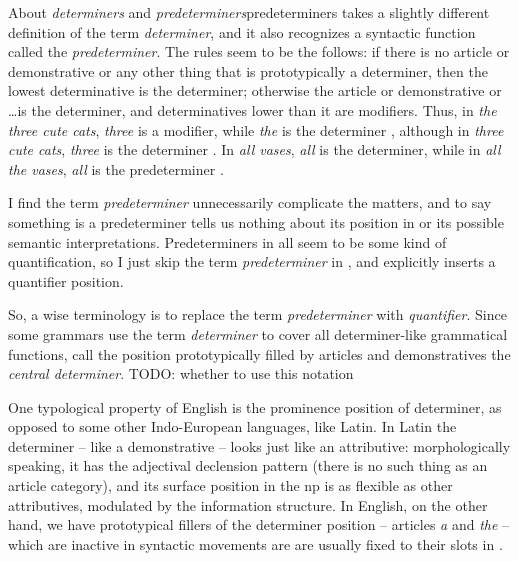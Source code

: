 \documentclass[UTF8, a4paper, oneside, scheme=plain, 12pt]{ctexbook}
\newcommand*{\citepage}[1]{p.~{#1}}
\newcommand*{\term}[1]{\emph{#1}}
\newcommand{\form}[1]{\emph{#1}}
\begin{document}
\begin{infobox}{About \term{determiners} and \term{predeterminers}}{predeterminers}
    \citet[\citepage{331}]{cgel} takes a slightly different definition of the term \term{determiner},
    and it also recognizes a syntactic function called the \term{predeterminer}.
    The rules seem to be the follows: 
    if there is no article or demonstrative or any other thing that is prototypically a determiner,
    then the lowest determinative is the determiner;
    otherwise the article or demonstrative or \dots is the determiner,
    and determinatives lower than it are modifiers.
    Thus, in \form{the three cute cats},
    \form{three} is a modifier, while \form{the} is the determiner 
    \citep[\citepage{356}, {[4ii]}]{cgel},
    although in \form{three cute cats}, \form{three} is the determiner 
    \citep[\citepage{355}, {[2ii]}; ]{cgel}.
    In \form{all vases}, \form{all} is the determiner,
    while in \form{all the vases}, \form{all} is the predeterminer
    \citep[\citepage{356}, {[4i]}]{cgel}.

    I find the term \term{predeterminer} unnecessarily complicate the matters,
    and to say something is a predeterminer 
    tells us nothing about its position in 
    or its possible semantic interpretations.
    Predeterminers in \citet[\citepage{433}]{cgel}
    all seem to be some kind of quantification,
    so I just skip the term \term{predeterminer} in ,
    and explicitly inserts a quantifier position.

    So, a wise terminology is to replace the term \term{predeterminer} with \term{quantifier}.
    Since some grammars use the term \term{determiner} to cover all determiner-like grammatical functions,
    \citet[\citepage{253}]{quirk1985} call the position prototypically filled by 
    articles and demonstratives 
    the \term{central determiner}. TODO: whether to use this notation
\end{infobox}

One typological property of English is 
the prominence position of determiner,
as opposed to some other Indo-European languages, like Latin.
In Latin the determiner -- like a demonstrative -- 
looks just like an attributive:
morphologically speaking, it has the adjectival declension pattern
(there is no such thing as an article category),
and its surface position in the \acs{np} 
is as flexible as other attributives,
modulated by the information structure.
In English, on the other hand, we have prototypical fillers of the determiner position
-- articles \form{a} and \form{the} -- 
which are inactive in syntactic movements 
are are usually fixed to their slots in .
\end{document}
